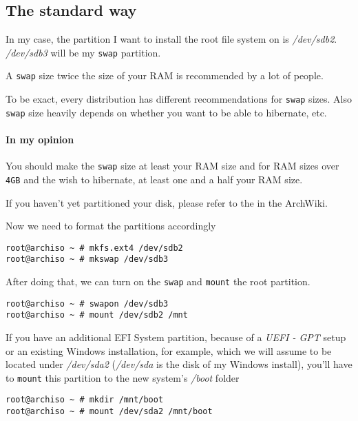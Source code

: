 \documentclass[10pt]{dustdoc}
\begin{document}
\subsection{The standard way}
\label{sec:the-standard-way}

In my case, the partition I want to install the root file system on is \textit{/dev/sdb2}.
\textit{/dev/sdb3} will be my \texttt{swap} partition.

\begin{NOTE}
    A \texttt{swap} size twice the size of your RAM is recommended by a lot of people.

    To be exact, every distribution has different recommendations for \texttt{swap} sizes.
    Also \texttt{swap} size heavily depends on whether you want to be able to hibernate, etc.

    \paragraph{In my opinion}
    You should make the \texttt{swap} size at least your RAM size and for RAM sizes over \texttt{4GB} and the wish to hibernate, at least one and a half your RAM size.
\end{NOTE}

\begin{IMPORTANT}
    If you haven’t yet partitioned your disk, please refer to the  in the ArchWiki.
\end{IMPORTANT}

Now we need to format the partitions accordingly

\begin{verbatim}
root@archiso ~ # mkfs.ext4 /dev/sdb2
root@archiso ~ # mkswap /dev/sdb3
\end{verbatim}

After doing that, we can turn on the \texttt{swap} and \texttt{mount} the root partition.

\begin{verbatim}
root@archiso ~ # swapon /dev/sdb3
root@archiso ~ # mount /dev/sdb2 /mnt
\end{verbatim}

\begin{NOTE}
    If you have an additional EFI System partition, because of a \emph{UEFI - GPT} setup or an existing Windows installation, for example, which we will assume to be located under \textit{/dev/sda2} (\textit{/dev/sda} is the disk of my Windows install), you’ll have to \texttt{mount} this partition to the new system's \textit{/boot} folder

    \begin{verbatim}
root@archiso ~ # mkdir /mnt/boot
root@archiso ~ # mount /dev/sda2 /mnt/boot
    \end{verbatim}
\end{NOTE}
\end{document}
